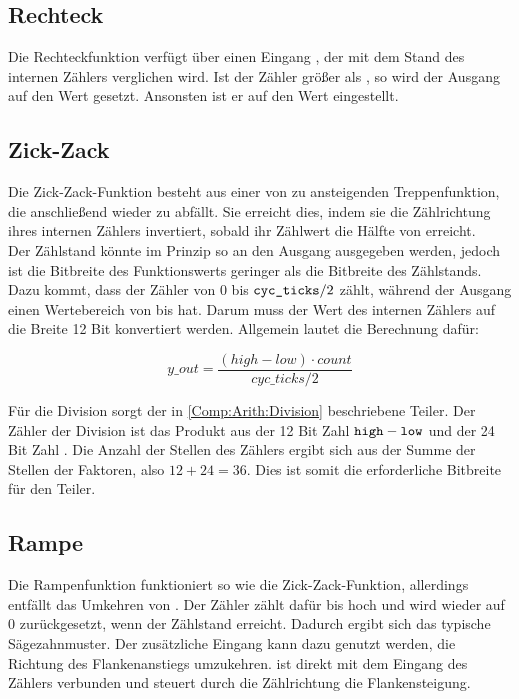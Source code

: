\subsection{Rechteck}   \label{Comp:Func:Square}
Die Rechteckfunktion verfügt über einen Eingang , der mit dem Stand des internen Zählers verglichen wird.
Ist der Zähler größer als , so wird der Ausgang auf den Wert  gesetzt.
Ansonsten ist er auf den Wert  eingestellt.

\subsection{Zick-Zack}  \label{Comp:Func:ZigZag}
Die Zick-Zack-Funktion besteht aus einer von  zu  ansteigenden Treppenfunktion, die anschließend wieder zu  abfällt.
Sie erreicht dies, indem sie die Zählrichtung  ihres internen Zählers invertiert, sobald ihr Zählwert  die Hälfte von  erreicht. \\
Der Zählstand könnte im Prinzip so an den Ausgang ausgegeben werden, jedoch ist die Bitbreite des Funktionswerts geringer als die Bitbreite des Zählstands.
Dazu kommt, dass der Zähler von 0 bis $\texttt{cyc\_ticks} / 2$ zählt, während der Ausgang einen Wertebereich von  bis  hat.
Darum muss der Wert des internen Zählers auf die Breite 12 Bit konvertiert werden.
Allgemein lautet die Berechnung dafür:

$$ y\_out = \frac{(high - low) \cdot count}{cyc\_ticks / 2} $$

Für die Division sorgt der in \cref{Comp:Arith:Division} beschriebene Teiler.
Der Zähler der Division ist das Produkt aus der 12 Bit Zahl $\texttt{high} - \texttt{low}$ und der 24 Bit Zahl .
Die Anzahl der Stellen des Zählers ergibt sich aus der Summe der Stellen der Faktoren, also $12 + 24 = 36$.
Dies ist somit die erforderliche Bitbreite für den Teiler.

\subsection{Rampe} \label{Comp:Func:Ramp}
Die Rampenfunktion funktioniert so wie die Zick-Zack-Funktion, allerdings entfällt das Umkehren von .
Der Zähler zählt dafür bis  hoch und wird wieder auf 0 zurückgesetzt, wenn der Zählstand  erreicht.
Dadurch ergibt sich das typische Sägezahnmuster.
Der zusätzliche Eingang  kann dazu genutzt werden, die Richtung des Flankenanstiegs umzukehren.
 ist direkt mit dem Eingang  des Zählers verbunden und steuert durch die Zählrichtung die Flankensteigung.

